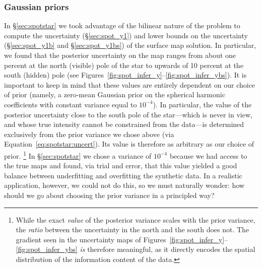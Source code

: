 \documentclass[modern]{aastex631}
\begin{document}
\subsubsection{Gaussian priors}
\label{sec:discussion:priors:gaussian}
%
In \S\ref{sec:spotstar} we took advantage of the bilinear nature of the problem to compute the uncertainty (\S\ref{sec:spot_y1}) and lower bounds on the uncertainty (\S\ref{sec:spot_y1b} and \S\ref{sec:spot_y1bs}) of the surface map solution. 
In particular, we found that the posterior uncertainty on the map ranges from about one percent at the north (visible) pole of the star to upwards of 10 percent at the south (hidden) pole (see Figures~\ref{fig:spot_infer_y}--\ref{fig:spot_infer_ybs}).
It is important to keep in mind that these values are entirely dependent on our choice of prior (namely, a zero-mean Gaussian prior on the spherical harmonic coefficients with constant variance equal to $10^{-4}$).
In particular, the value of the posterior uncertainty close to the south pole of the star---which is never in view, and whose true intensity cannot be constrained from the data---is determined exclusively from the prior variance we chose above (via Equation~\ref{eq:spotstar:uncert}).
Its value is therefore as arbitrary as our choice of prior.%
\footnote{While the exact \emph{value} of the posterior variance scales with the prior variance, the \emph{ratio} between the uncertainty in the north and the south does not. 
The gradient seen in the uncertainty maps of Figures~\ref{fig:spot_infer_y}--\ref{fig:spot_infer_ybs} \emph{is} therefore meaningful, as it directly encodes the spatial distribution of the information content of the data.}
In \S\ref{sec:spotstar} we chose a variance of $10^{-4}$ because we had access to the true maps and found, via trial and error, that this value yielded a good balance between underfitting and overfitting the synthetic data. 
In a realistic application, however, we could not do this, so we must naturally wonder: how should we go about choosing the prior variance in a principled way?
\end{document}

